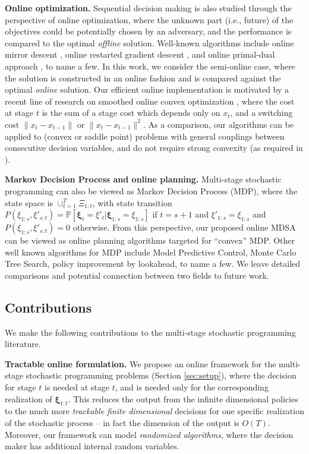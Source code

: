 \documentclass[11pt,fullpage,letterpaper]{article}
\newcommand{\p}{\mathbb{P}}
\newcommand{\bx}{\boldsymbol{\xi}}
\begin{document}
\textbf{Online optimization.} Sequential decision making is also studied through the perspective of online optimization, where the unknown part (i.e., future) of the objectives could be potentially chosen by an adversary, and the performance is compared to the optimal \textit{offline} solution. Well-known algorithms include online mirror descent \cite{Hazan2022Online,Zinkevich2003}, online restarted gradient descent \cite{BesbesGurZeevi2015}, and online primal-dual approach \cite{BuchbinderCompetitive}, to name a few. In this work, we consider the semi-online case, where the solution is constructed in an online fashion and is compared against the optimal \textit{online} solution. Our efficient online implementation is motivated by a recent line of research on smoothed online convex optimization \cite{bansal_et_al,goel19a,LiChenLi2019,LiLi2020,LiQuLi2021,Lin2012,ZhangLiLi2021}, where the cost at stage $t$ is the sum of a stage cost which depends only on $x_t$, and a switching cost $\|x_t-x_{t-1}\|$ or $\|x_t-x_{t-1}\|^2$. As a comparison, our algorithms can be applied to (convex or saddle point) problems with general couplings between consecutive decision variables, and do not require strong convexity (as required in \cite{LiLi2020,LiQuLi2021}). 

\textbf{Markov Decision Process and online planning.} Multi-stage stochastic programming can also be viewed as Markov Decision Process (MDP), where the state space is $\cup_{t=1}^T \Xi_{1:t}$, with state transition $P(\xi_{1:s},\xi'_{s:t}) = \p[\bx_{t} = \xi'_{t}|\bx_{1:s} = \xi_{1:s}]$ if $t=s+1$ and $\xi'_{1:s} = \xi_{1:s}$ and $P(\xi_{1:s},\xi'_{s:t})=0$ otherwise. From this perspective, our proposed online MDSA can be viewed as online planning algorithms targeted for ``convex'' MDP. Other well known algorithms for MDP include Model Predictive Control, Monte Carlo Tree Search, policy improvement by lookahead, to name a few. We leave detailed comparisons and potential connection between two fields to future work. 

\subsection{Contributions}



We make the following contributions to the multi-stage stochastic programming literature.


\textbf{Tractable online formulation.} We propose an online framework for the multi-stage stochastic programming problems (Section \ref{sec:setup}), where the decision for stage $t$ is needed at stage $t$, and is needed only for the corresponding realization of $\bx_{1:t}$. This reduces the output from the infinite dimensional policies to the much more \textit{trackable finite dimensional} decisions for one specific realization of the stochastic process -- in fact the dimension of the output is $O(T)$. Moreover, our framework can model \textit{randomized algorithms}, where the decision maker has additional internal random variables. 
\end{document}
